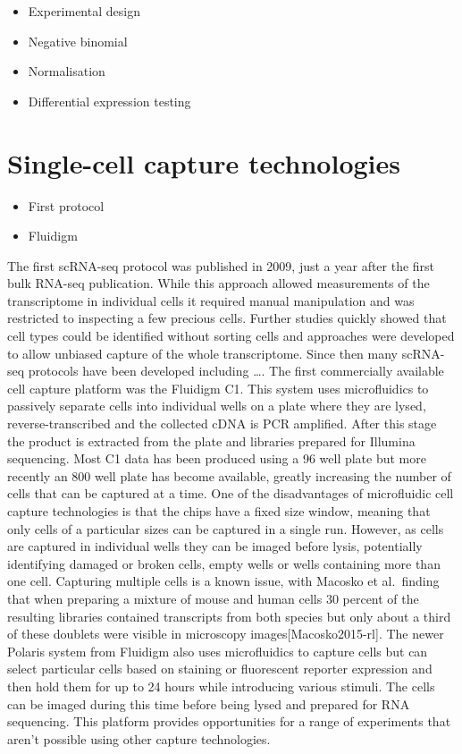 \documentclass[11pt,a4paper,titlepage,twoside,openright]{style/unimelbthesis}
\theoremstyle{definition}
\theoremstyle{definition}
\theoremstyle{definition}
\theoremstyle{remark}
\begin{document}
\begin{mainmatter}
\begin{itemize}
\tightlist
\item
  Experimental design
\item
  Negative binomial
\item
  Normalisation
\item
  Differential expression testing
\end{itemize}

\hypertarget{single-cell-capture-technologies}{%
\section{Single-cell capture technologies}\label{single-cell-capture-technologies}}

\begin{itemize}
\tightlist
\item
  First protocol
\item
  Fluidigm
\end{itemize}

The first scRNA-seq protocol was published in 2009, just a year after the first bulk RNA-seq publication. While this approach allowed measurements of the transcriptome in individual cells it required manual manipulation and was restricted to inspecting a few precious cells. Further studies quickly showed that cell types could be identified without sorting cells and approaches were developed to allow unbiased capture of the whole transcriptome. Since then many scRNA-seq protocols have been developed including \ldots{}. The first commercially available cell capture platform was the Fluidigm C1. This system uses microfluidics to passively separate cells into individual wells on a plate where they are lysed, reverse-transcribed and the collected cDNA is PCR amplified. After this stage the product is extracted from the plate and libraries prepared for Illumina sequencing. Most C1 data has been produced using a 96 well plate but more recently an 800 well plate has become available, greatly increasing the number of cells that can be captured at a time. One of the disadvantages of microfluidic cell capture technologies is that the chips have a fixed size window, meaning that only cells of a particular sizes can be captured in a single run. However, as cells are captured in individual wells they can be imaged before lysis, potentially identifying damaged or broken cells, empty wells or wells containing more than one cell. Capturing multiple cells is a known issue, with Macosko et al.~finding that when preparing a mixture of mouse and human cells 30 percent of the resulting libraries contained transcripts from both species but only about a third of these doublets were visible in microscopy images{[}Macosko2015-rl{]}. The newer Polaris system from Fluidigm also uses microfluidics to capture cells but can select particular cells based on staining or fluorescent reporter expression and then hold them for up to 24 hours while introducing various stimuli. The cells can be imaged during this time before being lysed and prepared for RNA sequencing. This platform provides opportunities for a range of experiments that aren't possible using other capture technologies.


\end{mainmatter}
\end{document}
